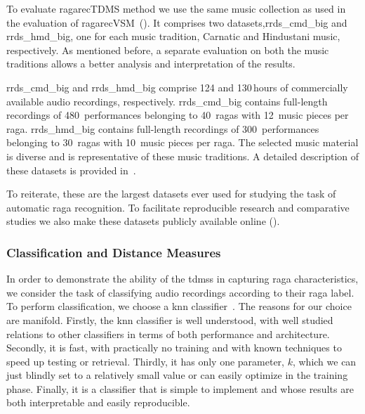 To evaluate \acrshort{ragarecTDMS} method we use the same music collection as used in the evaluation of \acrshort{ragarecVSM}~(). It comprises two datasets,\acrshort{rrds_cmd_big} and \acrshort{rrds_hmd_big}, one for each music tradition, Carnatic and Hindustani music, respectively. As mentioned before, a separate evaluation on both the music traditions allows a better analysis and interpretation of the results.

\acrshort{rrds_cmd_big} and \acrshort{rrds_hmd_big} comprise 124 and 130\,hours of commercially available audio recordings, respectively. \acrshort{rrds_cmd_big} contains full-length recordings of 480~performances belonging to 40~\glspl{raga} with 12~music pieces per \gls{raga}. \acrshort{rrds_hmd_big} contains full-length recordings of 300~performances belonging to 30~\glspl{raga} with 10~music pieces per \gls{raga}. The selected music material is diverse and is representative of these music traditions. A detailed description of these datasets is provided in~.

To reiterate, these are the largest datasets ever used for studying the task of automatic \gls{raga} recognition. To facilitate reproducible research and comparative studies we also make these datasets publicly available online ().


\subsubsection{Classification and Distance Measures}
\label{sec:tdms_classification_evaluation}

In order to demonstrate the ability of the \glspl{tdms} in capturing \gls{raga} characteristics, we consider the task of classifying audio recordings according to their \gls{raga} label. To perform classification, we choose a \acrfull{knn} classifier~\cite{Mitchell97BOOK}. The reasons for our choice are manifold. Firstly, the \gls{knn} classifier is well understood, with well studied relations to other classifiers in terms of both performance and architecture. Secondly, it is fast, with practically no training and with known techniques to speed up testing or retrieval. Thirdly, it has only one parameter, $k$, which we can just blindly set to a relatively small value or can easily optimize in the training phase. Finally, it is a classifier that is simple to implement and whose results are both interpretable and easily reproducible. 

